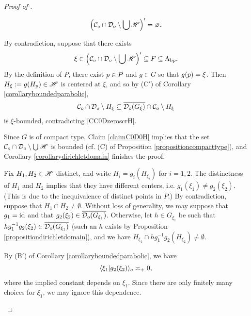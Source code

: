 \begin{proof}[Proof of  \implies {}]
\begin{subproof}
\begin{figure}
\end{figure}
\end{subproof}
\begin{subproof}
\begin{claim}
\label{claimC0D0H}
\[
\Bigl( \CC_\zero \cap \DD_\zero \setminus \bigcup\scrH \Bigr)' = \emptyset.
\]
\end{claim}
\begin{subproof}
By contradiction, suppose that there exists
\begin{equation}
\label{CC0DzeroscrH}
\xi\in\Bigl( \mathcal C_o \cap \mathcal D_o \setminus \bigcup\mathscr H \Bigr)' \subseteq F \subseteq \Lambda_{\mathrm{bp}} .
\end{equation}
By the definition of $P$, there exist $p\in P$ and $g\in G$ so that $g(p) = \xi$. Then $H_\xi := g(H_p)\in\mathscr H$ is centered at $\xi$, and so by (C$'$) of Corollary \ref{corollaryboundedparabolic}, 
\[
\mathcal C_o\cap\mathcal D_o\setminus H_\xi \subseteq \overline{\mathcal D_o(G_\xi)}\cap\mathcal C_o\setminus H_\xi
\] 
is $\xi$-bounded, contradicting \eqref{CC0DzeroscrH}.
\end{subproof}
Since $G$ is of compact type, Claim \ref{claimC0D0H} implies that the set $\mathcal C_o \cap \mathcal D_o \setminus \bigcup\mathscr H$ is bounded (cf. (C) of Proposition \ref{propositioncompacttype}), and Corollary \ref{corollarydirichletdomain} finishes the proof.
\end{subproof}
\begin{subproof}
Fix $H_1,H_2\in\mathscr H$ distinct, and write $H_i = g_i(H_{\xi_i})$ for $i = 1, 2$. The distinctness of $H_1$ and $H_2$ implies that they have different centers, i.e. $g_1(\xi_1) \neq g_2(\xi_2)$. (This is due to the inequivalence of distinct points in $P$.) By contradiction, suppose that $H_1\cap H_2\neq\emptyset$. Without loss of generality, we may suppose that $g_1 = \mathrm{id}$ and that $g_2(\xi_2)\in\overline{\mathcal D_o(G_{\xi_1})}$. Otherwise, let $h\in G_{\xi_1}$ be such that $hg_1^{-1}g_2(\xi_2)\in\overline{\mathcal D_o(G_{\xi_1})}$ (such an $h$ exists by Proposition \ref{propositiondirichletdomain}), and we have $H_{\xi_1}\cap hg_1^{-1}g_2(H_{\xi_2}) \neq \emptyset$.

By (B$'$) of Corollary \ref{corollaryboundedparabolic}, we have
\[
\langle \xi_1 | g_2(\xi_2)\rangle_o \asymp_+ 0,
\]
where the implied constant depends on $\xi_1$. Since there are only finitely many choices for $\xi_1$, we may ignore this dependence.


\end{subproof}
\end{proof}
